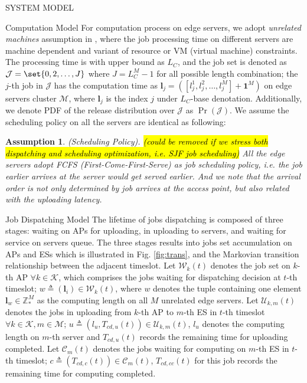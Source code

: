\documentclass[10pt, conference, letterpaper]{IEEEtran}
\newtheorem{assumption}{Assumption}
\newcommand{\domZ}{\mathbb{Z}_{*}}
\newcommand{\vecOne}{\mathbf{1}}
\renewcommand{\vec}{\mathbf}
\DeclarePairedDelimiter\set\{\}
\newcommand{\apSet}{\mathcal{K}}
\newcommand{\esSet}{\mathcal{M}}
\newcommand{\jSet}{\mathcal{J}}
\newcommand{\wSet}{\mathcal{W}}
\newcommand{\uSet}{\mathcal{U}}
\newcommand{\cSet}{\mathcal{C}}
\begin{document}
\begin{section}{SYSTEM MODEL}
        \begin{subsection}{Computation Model}
            For computation process on edge servers, we adopt \emph{unrelated machines} assumption in \cite{tan-online}, where the job processing time on different servers are machine dependent and variant of resource or VM (virtual machine) constraints. The processing time is with upper bound as $L_C$, and the job set is denoted as $\mathcal{J} = \set{0,2,\dots, J}$ where $J=L_C^M-1$ for all possible length combination; the $j$-th job in $\jSet$ has the computation time as $\vec{l}_j = ([l_j^1, l_j^2, \dots, l_j^M] + \vecOne^M)$ on edge servers cluster $\esSet$, where $\vec{l}_j$ is the index $j$ under $L_C$-base denotation. Additionally, we denote PDF of the release distribution over $\jSet$ as $\Pr(\jSet)$.
            We assume the scheduling policy on all the servers are identical as following:
            \begin{assumption}
                (Scheduling Policy).
                \hl{(could be removed if we stress both dispatching and scheduling optimization, i.e. SJF job scheduling)}
                All the edge servers adopt \emph{FCFS} (First-Come-First-Serve) as job scheduling policy, i.e. the job earlier arrives at the server would get served earlier. And we note that the arrival order is not only determined by job arrives at the access point, but also related with the uploading latency.
            \end{assumption}
        \end{subsection}

        \begin{subsection}{Job Dispatching Model}
            The lifetime of jobs dispatching is composed of three stages: waiting on APs for uploading, in uploading to servers, and waiting for service on servers queue. The three stages results into jobs set accumulation on APs and ESs which is illustrated in Fig. \ref{fig:trans}, and the Markovian transition relationship between the adjacent timeslot.
            Let $\wSet_{k}(t)$ denotes the job set on $k$-th AP $\forall k \in \apSet$, which comprises the jobs waiting for dispatching decision at $t$-th timeslot; $w \triangleq (\vec{l}_i) \in \wSet_{k}(t)$, where $w$ denotes the tuple containing one element $\vec{l}_w \in \domZ^M$ as the computing length on all $M$ unrelated edge servers.
            Let $\uSet_{k,m}(t)$ denotes the jobs in uploading from $k$-th AP to $m$-th ES in $t$-th timeslot $\forall k \in \apSet, m \in \esSet$; $u \triangleq (l_u, T_{cd,u}(t)) \in \uSet_{k,m}(t)$, $l_u$ denotes the computing length on $m$-th server and $T_{cd,u}(t)$ records the remaining time for uploading completed.
            Let $\cSet_{m}(t)$ denotes the jobs waiting for computing on $m$-th ES in $t$-th timeslot; $c \triangleq (T_{cd,c}(t)) \in \cSet_{m}(t)$, $T_{cd,cc}(t)$ for this job records the remaining time for computing completed.


\end{subsection}
\end{section}
\end{document}
